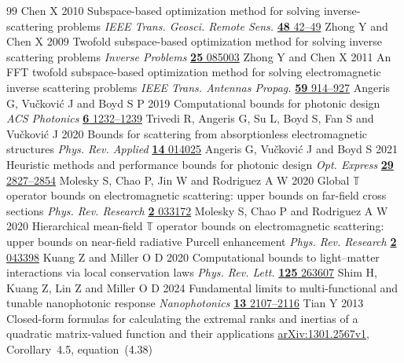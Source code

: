 \begin{thebibliography}{99}\setlength{\itemsep}{0pt}\setlength{\parsep}{0pt}
 Chen X 2010 Subspace-based optimization method for solving inverse-scattering problems \emph{IEEE Trans. Geosci. Remote Sens.} \href{https://doi.org/10.1109/TGRS.2009.2025122}{\textbf{48} 42--49}
 Zhong Y and Chen X 2009 Twofold subspace-based optimization method for solving inverse scattering problems \emph{Inverse Problems} \href{https://doi.org/10.1088/0266-5611/25/8/085003}{\textbf{25} 085003}
 Zhong Y and Chen X 2011 An FFT twofold subspace-based optimization method for solving electromagnetic inverse scattering problems \emph{IEEE Trans. Antennas Propag.} \href{https://doi.org/10.1109/TAP.2010.2103027}{\textbf{59} 914--927}
 Angeris G, Vu\v{c}kovi\'{c} J and Boyd S P 2019 Computational bounds for photonic design \emph{ACS Photonics} \href{https://doi.org/10.1021/acsphotonics.9b00154}{\textbf{6} 1232--1239}
 Trivedi R, Angeris G, Su L, Boyd S, Fan S and Vu\v{c}kovi\'{c} J 2020 Bounds for scattering from absorptionless electromagnetic structures \emph{Phys. Rev. Applied} \href{https://doi.org/10.1103/PhysRevApplied.14.014025}{\textbf{14} 014025}
 Angeris G, Vu\v{c}kovi\'{c} J and Boyd S 2021 Heuristic methods and performance bounds for photonic design \emph{Opt. Express} \href{https://doi.org/10.1364/OE.415052}{\textbf{29} 2827--2854}
 Molesky S, Chao P, Jin W and Rodriguez A W 2020 Global $\mathbb{T}$ operator bounds on electromagnetic scattering: upper bounds on far-field cross sections \emph{Phys. Rev. Research} \href{https://doi.org/10.1103/PhysRevResearch.2.033172}{\textbf{2} 033172}
 Molesky S, Chao P and Rodriguez A W 2020 Hierarchical mean-field $\mathbb{T}$ operator bounds on electromagnetic scattering: upper bounds on near-field radiative Purcell enhancement \emph{Phys. Rev. Research} \href{https://doi.org/10.1103/PhysRevResearch.2.043398}{\textbf{2} 043398}
 Kuang Z and Miller O D 2020 Computational bounds to light--matter interactions via local conservation laws \emph{Phys. Rev. Lett.} \href{https://doi.org/10.1103/PhysRevLett.125.263607}{\textbf{125} 263607}
 Shim H, Kuang Z, Lin Z and Miller O D 2024 Fundamental limits to multi-functional and tunable nanophotonic response \emph{Nanophotonics} \href{https://doi.org/10.1515/nanoph-2023-0630}{\textbf{13} 2107--2116}
 Tian Y 2013 Closed-form formulas for calculating the extremal ranks and inertias of a quadratic matrix-valued function and their applications \href{https://arxiv.org/abs/1301.2567v1}{arXiv:1301.2567v1}, Corollary~4.5, equation~(4.38)

\end{thebibliography}
